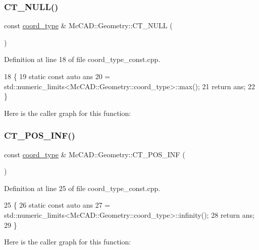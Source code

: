 \subsubsection{\texorpdfstring{C\+T\+\_\+\+N\+U\+L\+L()}{CT\_NULL()}}
{\footnotesize\ttfamily const \hyperlink{namespaceMcCAD_1_1Geometry_ac043b37a4a7e849fca22869e1982d2f8}{coord\+\_\+type} \& Mc\+C\+A\+D\+::\+Geometry\+::\+C\+T\+\_\+\+N\+U\+LL (\begin{DoxyParamCaption}{ }\end{DoxyParamCaption})}



Definition at line 18 of file coord\+\_\+type\+\_\+const.\+cpp.


\begin{DoxyCode}
18                       \{
19     \textcolor{keyword}{static} \textcolor{keyword}{const} \textcolor{keyword}{auto} ans
20             = std::numeric\_limits<McCAD::Geometry::coord\_type>::max();
21     \textcolor{keywordflow}{return} ans;
22 \}
\end{DoxyCode}
Here is the caller graph for this function\+:
\mbox{\label{namespaceMcCAD_1_1Geometry_a945de946c04dd593309595bc369b5163}} 
\subsubsection{\texorpdfstring{C\+T\+\_\+\+P\+O\+S\+\_\+\+I\+N\+F()}{CT\_POS\_INF()}}
{\footnotesize\ttfamily const \hyperlink{namespaceMcCAD_1_1Geometry_ac043b37a4a7e849fca22869e1982d2f8}{coord\+\_\+type} \& Mc\+C\+A\+D\+::\+Geometry\+::\+C\+T\+\_\+\+P\+O\+S\+\_\+\+I\+NF (\begin{DoxyParamCaption}{ }\end{DoxyParamCaption})}



Definition at line 25 of file coord\+\_\+type\+\_\+const.\+cpp.


\begin{DoxyCode}
25                          \{
26     \textcolor{keyword}{static} \textcolor{keyword}{const} \textcolor{keyword}{auto} ans
27             = std::numeric\_limits<McCAD::Geometry::coord\_type>::infinity();
28     \textcolor{keywordflow}{return} ans;
29 \}
\end{DoxyCode}
Here is the caller graph for this function\+:
\mbox{\label{namespaceMcCAD_1_1Geometry_a492f5d9026e8ba8e85f0c81dfb0694ea}} 
